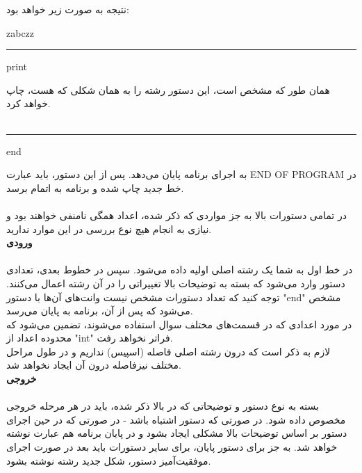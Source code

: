 \documentclass[]{article}
\begin{document}
نتیجه به صورت زیر خواهد بود:
\begin{tcolorbox}[boxrule=0pt]
	\begin{latin}
  	  \large{
  	  	zabczz
		}
	\end{latin}
\end{tcolorbox}
\noindent\rule[0.5ex]{\linewidth}{1pt}
\begin{tcolorbox}[boxrule=0pt]
	\begin{latin}
  	  \large{
  	  	print
		}
	\end{latin}
\end{tcolorbox}
همان طور که مشخص است، این دستور رشته را به همان شکلی که هست، چاپ خواهد کرد.\\\\
\noindent\rule[0.5ex]{\linewidth}{1pt}
\begin{tcolorbox}[boxrule=0pt]
	\begin{latin}
  	  \large{
  	  	end
		}
	\end{latin}
\end{tcolorbox}
به اجرای برنامه پایان می‌دهد. پس از این دستور، باید عبارت END OF PROGRAM  در خط جدید چاپ شده و برنامه به اتمام برسد.\\\\
در تمامی دستورات بالا به جز مواردی که ذکر شده، اعداد همگی نامنفی خواهند بود و نیازی به انجام هیچ نوع بررسی در این موارد ندارید.\\

\textbf{ورودی}\\\\
در خط اول به شما یک رشته اصلی اولیه داده می‌شود. سپس در خطوط بعدی، تعدادی دستور وارد می‌شود که بسته به توضیحات بالا تغییراتی را در آن رشته اعمال می‌کنند. توجه کنید که تعداد دستورات مشخص نیست وانت‌های آن‌ها با دستور "end" مشخص می‌شود که پس از آن، برنامه به پایان می‌رسد.\\
در مورد اعدادی که در قسمت‌های مختلف سوال استفاده می‌شوند، تضمین می‌شود که محدوده اعداد از "int" فراتر نخواهد رفت.\\
لازم به ذکر است که درون رشته اصلی فاصله (اسپیس) نداریم و در طول مراحل مختلف نیزفاصله درون آن ایجاد نخواهد شد.\\


\textbf{خروجی}\\\\
بسته به نوع دستور و توضیحاتی که در بالا ذکر شده، باید در هر مرحله خروجی مخصوص داده شود. در صورتی که دستور اشتباه باشد 
- در صورتی که در حین اجرای دستور بر اساس توضیحات بالا مشکلی ایجاد بشود 
و در پایان برنامه هم عبارت
 نوشته خواهد شد. به جز برای دستور پایان، برای سایر دستورات باید بعد در صورت اجرای موفقیت‌آمیز دستور، شکل جدید رشته نوشته بشود.\\
\end{document}
